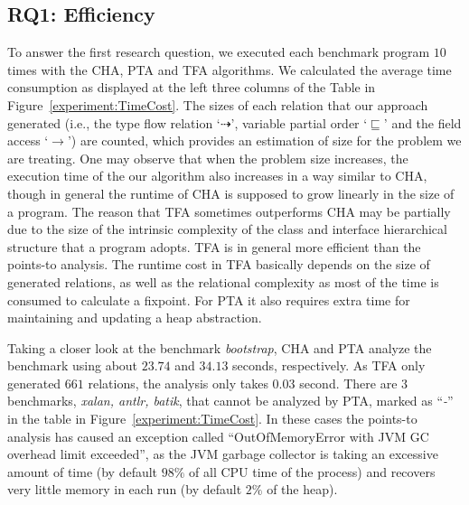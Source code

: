 \documentclass{llncs}
\newcommand{\less}{\sqsubseteq}
\newcommand{\tflow}{\dashrightarrow}
\begin{document}
\subsection{RQ1: Efficiency}\label{subsec:efficiency}
To answer the first research question, we executed each benchmark program $10$ times with the CHA, PTA and TFA algorithms. We calculated the average time consumption as displayed at the left three columns of the Table in Figure~\ref{experiment:TimeCost}. The sizes of each relation that our approach generated (i.e., the type flow relation `$\tflow$', variable partial order `$\less$' and the field access `$\rightarrow$') are counted, which provides an estimation of size for the problem we are treating. One may observe that when the problem size increases, the execution time of the our algorithm also increases in a way similar to CHA, though in general the runtime of CHA is supposed to grow linearly in the size of a program. The reason that TFA sometimes outperforms CHA may be partially due to the size of the intrinsic complexity of the class and interface hierarchical structure that a program adopts. TFA is in general more efficient than the points-to analysis.
The runtime cost in TFA basically depends on the size of generated relations, as well as the relational complexity as most of the time is consumed to calculate a fixpoint. For PTA it also requires extra time for maintaining and updating a heap abstraction.

Taking a closer look at the benchmark \textit{bootstrap}, CHA and PTA analyze the benchmark using about $23.74$ and $34.13$ seconds, respectively. As TFA only generated $661$ relations, the analysis only takes $0.03$ second. 
There are $3$ benchmarks, \textit{xalan, antlr, batik}, that cannot be analyzed by PTA, marked as ``\emph{-}'' in the table in Figure~\ref{experiment:TimeCost}. In these cases the points-to analysis has caused an exception called ``OutOfMemoryError with JVM GC overhead limit exceeded'', as the JVM garbage collector is taking an excessive amount of time (by default $98\%$ of all CPU time of the process) and recovers very little memory in each run (by default $2\%$ of the heap).
\end{document}
